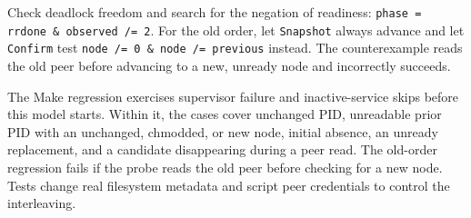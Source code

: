 \documentclass[a4paper,10pt]{article}
\begin{document}
Check deadlock freedom and search for the negation of readiness:
\verb|phase = rrdone & observed /= 2|. For the old order, let
\texttt{Snapshot} always advance and let \texttt{Confirm} test
\verb|node /= 0 & node /= previous| instead. The counterexample reads the
old peer before advancing to a new, unready node and incorrectly succeeds.

The Make regression exercises supervisor failure and inactive-service skips
before this model starts. Within it, the cases cover unchanged PID,
unreadable prior PID with an unchanged, chmodded, or new node, initial absence,
an unready replacement, and a candidate disappearing during a peer read.
The old-order regression fails if the probe reads the old peer before
checking for a new node. Tests change real filesystem metadata and script
peer credentials to control the interleaving.
\end{document}
